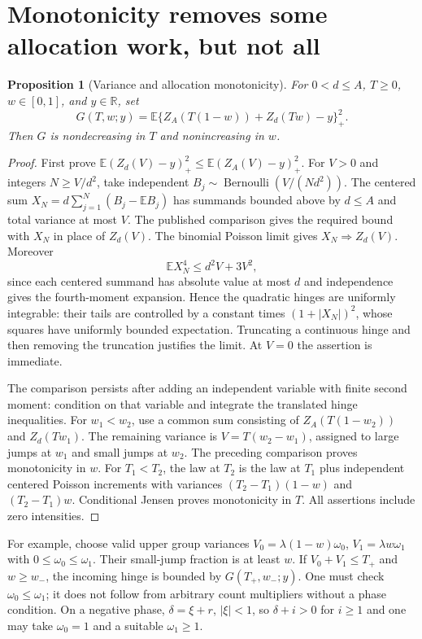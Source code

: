 \documentclass[11pt]{article}
\newtheorem{proposition}{Proposition}
\newcommand{\E}{\mathbb E}
\newcommand{\1}{\mathbf1}
\begin{document}
\section{Monotonicity removes some allocation work, but not all}
\begin{proposition}[Variance and allocation monotonicity]\label{prop:mono}
For $0<d\le A$, $T\ge0$, $w\in[0,1]$, and $y\in\mathbb R$, set
\[
 G(T,w;y)=\E\{Z_A(T(1-w))+Z_d(Tw)-y\}_+^2.
\]
Then $G$ is nondecreasing in $T$ and nonincreasing in $w$.
\end{proposition}
\begin{proof}
First prove $\E(Z_d(V)-y)_+^2\le\E(Z_A(V)-y)_+^2$.
For $V>0$ and integers $N\ge V/d^2$, take independent
$B_j\sim\operatorname{Bernoulli}(V/(Nd^2))$.
The centered sum $X_N=d\sum_{j=1}^N(B_j-\E B_j)$ has summands bounded
above by $d\le A$ and total variance at most $V$. The published comparison
gives the required bound with $X_N$ in place of $Z_d(V)$.
The binomial Poisson limit gives $X_N\Rightarrow Z_d(V)$.
Moreover
\[
 \E X_N^4\le d^2V+3V^2,
\]
since each centered summand has absolute value at most $d$ and independence
gives the fourth-moment expansion. Hence the quadratic hinges are uniformly
integrable: their tails are controlled by a constant times
$(1+|X_N|)^2$, whose squares have uniformly bounded expectation.
Truncating a continuous hinge and then removing the truncation justifies
the limit. At $V=0$ the assertion is immediate.

The comparison persists after adding an independent variable with finite
second moment: condition on that variable and integrate the translated
hinge inequalities. For $w_1<w_2$, use a common sum consisting of
$Z_A(T(1-w_2))$ and $Z_d(Tw_1)$. The remaining variance is
$V=T(w_2-w_1)$, assigned to large jumps at $w_1$ and small jumps at
$w_2$. The preceding comparison proves monotonicity in $w$.
For $T_1<T_2$, the law at $T_2$ is the law at $T_1$ plus independent
centered Poisson increments with variances
$(T_2-T_1)(1-w)$ and $(T_2-T_1)w$. Conditional Jensen proves
monotonicity in $T$. All assertions include zero intensities.
\end{proof}

For example, choose valid upper group variances
$V_0=\lambda(1-w)\omega_0$, $V_1=\lambda w\omega_1$ with
$0\le\omega_0\le\omega_1$. Their small-jump fraction is at least $w$.
If $V_0+V_1\le T_+$ and $w\ge w_-$, the incoming hinge is bounded by
$G(T_+,w_-;y)$. One must check $\omega_0\le\omega_1$; it does not follow
from arbitrary count multipliers without a phase condition.
On a negative phase, $\delta=\xi+r$, $|\xi|<1$, so $\delta+i>0$
for $i\ge1$ and one may take $\omega_0=1$ and a suitable $\omega_1\ge1$.
\end{document}
